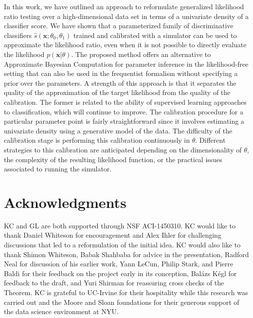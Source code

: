 \documentclass[12pt]{article}
\numberwithin{equation}{section}
\theoremstyle{plain}
\begin{document}
In this work, we have outlined an approach to reformulate generalized likelihood
ratio testing over a high-dimensional data set in terms of a univariate density
of a classifier score. We have shown that a parameterized family of
discriminative classifiers $\hat s(\mathbf{x}; \theta_0, \theta_1)$ trained and
calibrated with a simulator can be used to approximate the likelihood ratio,
even when it is not possible to directly evaluate the likelihood
$p(\mathbf{x}|\theta)$.
The proposed method offers an alternative to Approximate Bayesian Computation
for parameter inference in the likelihood-free setting that can also be used in
the frequentist formalism without specifying a prior over the parameters. A
strength of this approach is that it separates the quality of the approximation
of the target likelihood from the quality of the calibration. The former is
related to the ability of supervised learning approaches to  classification,
which will continue to improve. The calibration procedure for a particular
parameter point is fairly straightforward since it involves estimating a
univariate density using a generative model of the data. The difficulty of the
calibration stage is performing this calibration continuously in $\theta$.
Different strategies to this calibration are anticipated depending on the
dimensionality of $\theta$, the complexity of the resulting likelihood function,
or the practical issues associated to running the simulator.

\section*{Acknowledgments} KC and GL are both supported through NSF ACI-1450310.
KC would like to thank Daniel Whiteson for
encouragement and Alex Ihler for challenging discussions
that  led to a reformulation of the initial idea. KC would also like to thank
Shimon Whiteson, Babak Shahbaba for advice in the presentation, Radford Neal for
discussion of his earlier work, Yann LeCun, Philip Stark, and Pierre Baldi for
their feedback on the project early in its conception, Bal\'azs K\'egl for
feedback to the draft,  and Yuri
Shirman for reassuring cross checks of the Theorem.   KC is grateful
to UC-Irvine for their hospitality while this research was carried out and the
Moore and Sloan foundations for their generous support of the data science
environment at NYU.
\end{document}
